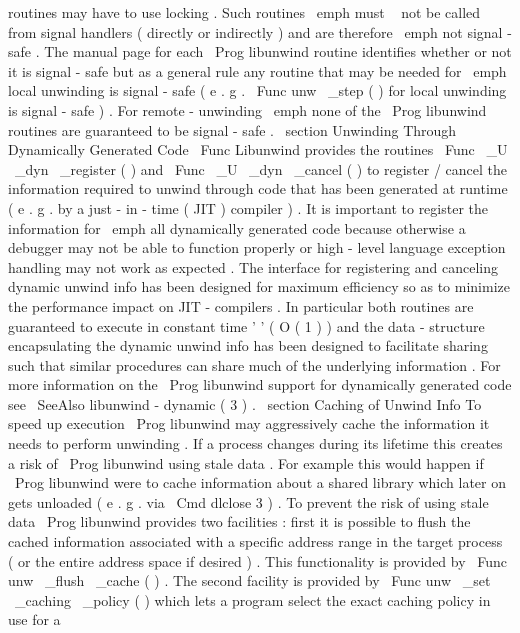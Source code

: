 routines
may
have
to
use
locking
.
Such
routines
\
emph
{
must
~
not
}
be
called
from
signal
handlers
(
directly
or
indirectly
)
and
are
therefore
\
emph
{
not
}
signal
-
safe
.
The
manual
page
for
each
\
Prog
{
libunwind
}
routine
identifies
whether
or
not
it
is
signal
-
safe
but
as
a
general
rule
any
routine
that
may
be
needed
for
\
emph
{
local
}
unwinding
is
signal
-
safe
(
e
.
g
.
\
Func
{
unw
\
_step
}
(
)
for
local
unwinding
is
signal
-
safe
)
.
For
remote
-
unwinding
\
emph
{
none
}
of
the
\
Prog
{
libunwind
}
routines
are
guaranteed
to
be
signal
-
safe
.
\
section
{
Unwinding
Through
Dynamically
Generated
Code
}
\
Func
{
Libunwind
}
provides
the
routines
\
Func
{
\
_U
\
_dyn
\
_register
}
(
)
and
\
Func
{
\
_U
\
_dyn
\
_cancel
}
(
)
to
register
/
cancel
the
information
required
to
unwind
through
code
that
has
been
generated
at
runtime
(
e
.
g
.
by
a
just
-
in
-
time
(
JIT
)
compiler
)
.
It
is
important
to
register
the
information
for
\
emph
{
all
}
dynamically
generated
code
because
otherwise
a
debugger
may
not
be
able
to
function
properly
or
high
-
level
language
exception
handling
may
not
work
as
expected
.
The
interface
for
registering
and
canceling
dynamic
unwind
info
has
been
designed
for
maximum
efficiency
so
as
to
minimize
the
performance
impact
on
JIT
-
compilers
.
In
particular
both
routines
are
guaranteed
to
execute
in
constant
time
'
'
(
O
(
1
)
)
and
the
data
-
structure
encapsulating
the
dynamic
unwind
info
has
been
designed
to
facilitate
sharing
such
that
similar
procedures
can
share
much
of
the
underlying
information
.
For
more
information
on
the
\
Prog
{
libunwind
}
support
for
dynamically
generated
code
see
\
SeeAlso
{
libunwind
-
dynamic
(
3
)
}
.
\
section
{
Caching
of
Unwind
Info
}
To
speed
up
execution
\
Prog
{
libunwind
}
may
aggressively
cache
the
information
it
needs
to
perform
unwinding
.
If
a
process
changes
during
its
lifetime
this
creates
a
risk
of
\
Prog
{
libunwind
}
using
stale
data
.
For
example
this
would
happen
if
\
Prog
{
libunwind
}
were
to
cache
information
about
a
shared
library
which
later
on
gets
unloaded
(
e
.
g
.
via
\
Cmd
{
dlclose
}
{
3
}
)
.
To
prevent
the
risk
of
using
stale
data
\
Prog
{
libunwind
}
provides
two
facilities
:
first
it
is
possible
to
flush
the
cached
information
associated
with
a
specific
address
range
in
the
target
process
(
or
the
entire
address
space
if
desired
)
.
This
functionality
is
provided
by
\
Func
{
unw
\
_flush
\
_cache
}
(
)
.
The
second
facility
is
provided
by
\
Func
{
unw
\
_set
\
_caching
\
_policy
}
(
)
which
lets
a
program
select
the
exact
caching
policy
in
use
for
a

